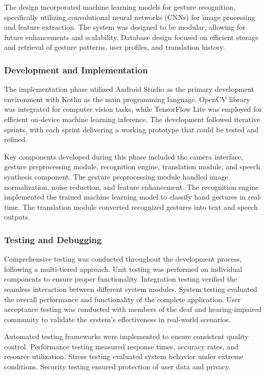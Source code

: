 \documentclass[12pt]{article}
\begin{document}
The design incorporated machine learning models for gesture recognition, specifically utilizing convolutional neural networks (CNNs) for image processing and feature extraction. The system was designed to be modular, allowing for future enhancements and scalability. Database design focused on efficient storage and retrieval of gesture patterns, user profiles, and translation history.

\subsubsection{Development and Implementation}

The implementation phase utilized Android Studio as the primary development environment with Kotlin as the main programming language. OpenCV library was integrated for computer vision tasks, while TensorFlow Lite was employed for efficient on-device machine learning inference. The development followed iterative sprints, with each sprint delivering a working prototype that could be tested and refined.

Key components developed during this phase included the camera interface, gesture preprocessing module, recognition engine, translation module, and speech synthesis component. The gesture preprocessing module handled image normalization, noise reduction, and feature enhancement. The recognition engine implemented the trained machine learning model to classify hand gestures in real-time. The translation module converted recognized gestures into text and speech outputs.

\subsubsection{Testing and Debugging}

Comprehensive testing was conducted throughout the development process, following a multi-tiered approach. Unit testing was performed on individual components to ensure proper functionality. Integration testing verified the seamless interaction between different system modules. System testing evaluated the overall performance and functionality of the complete application. User acceptance testing was conducted with members of the deaf and hearing-impaired community to validate the system's effectiveness in real-world scenarios.

Automated testing frameworks were implemented to ensure consistent quality control. Performance testing measured response times, accuracy rates, and resource utilization. Stress testing evaluated system behavior under extreme conditions. Security testing ensured protection of user data and privacy.
\end{document}
